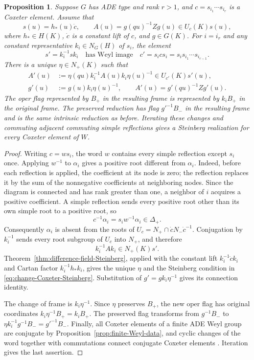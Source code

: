 \documentclass[11pt,leqno]{amsart}
\numberwithin{equation}{section}
\theoremstyle{plain}
\newtheorem{proposition}[theorem]{Proposition}
\theoremstyle{definition}
\theoremstyle{plain}
\theoremstyle{definition}
\theoremstyle{remark}
\begin{document}
\begin{proposition}\label{prop:change-Coxeter-oper-reduction}
Suppose $G$ has ADE type and rank $r>1$, and $c=s_{i_1}\cdots s_{i_r}$ is a Coxeter element. Assume that
\[
 s(u)=h_*(u)\dot c,\qquad
 A(u)=g(qu)^{-1}Zg(u)\in U_c(K)s(u),
\]
where $h_*\in H(K)$, $\dot c$ is a constant lift of $c$, and $g\in G(K)$. For $i=i_r$ and any constant representative $k_i\in N_G(H)$ of $s_i$, the element
\[
 s'=k_i^{-1}sk_i
 \quad\text{has Weyl image}\quad
 c'=s_i c s_i=s_i s_{i_1}\cdots s_{i_{r-1}}.
\]
There is a unique $\eta\in N_+(K)$ such that
\begin{equation}\label{eq:change-Coxeter-Steinberg}
 \begin{aligned}
 A'(u)&:=\eta(qu)k_i^{-1}A(u)k_i\eta(u)^{-1}
          \in U_{c'}(K)s'(u),\\
 g'(u)&:=g(u)k_i\eta(u)^{-1},\qquad
 A'(u)=g'(qu)^{-1}Zg'(u).
 \end{aligned}
\end{equation}
The oper flag represented by $B_+$ in the resulting frame is represented by $k_iB_+$ in the original frame. The preserved reduction has flag $g'^{-1}B_-$ in the resulting frame and is the same intrinsic reduction as before. Iterating these changes and commuting adjacent commuting simple reflections gives a Steinberg realization for every Coxeter element of $W$.
\end{proposition}
\begin{proof}
Writing $c=w s_i$, the word $w$ contains every simple reflection except $s_i$ once. Applying $w^{-1}$ to $\alpha_i$ gives a positive root different from $\alpha_i$. Indeed, before each reflection is applied, the coefficient at its node is zero; the reflection replaces it by the sum of the nonnegative coefficients at neighboring nodes. Since the diagram is connected and has rank greater than one, a neighbor of $i$ acquires a positive coefficient. A simple reflection sends every positive root other than its own simple root to a positive root, so
\[
 c^{-1}\alpha_i=s_iw^{-1}\alpha_i\in\Delta_+.
\]
Consequently $\alpha_i$ is absent from the roots of $U_c=N_+\cap\dot cN_-\dot c^{-1}$. Conjugation by $k_i^{-1}$ sends every root subgroup of $U_c$ into $N_+$, and therefore
\[
 k_i^{-1}Ak_i\in N_+(K)s'.
\]
Theorem~\ref{thm:difference-field-Steinberg}, applied with the constant lift $k_i^{-1}\dot c k_i$ and Cartan factor $k_i^{-1}h_*k_i$, gives the unique $\eta$ and the Steinberg condition in \eqref{eq:change-Coxeter-Steinberg}. Substitution of $g'=gk_i\eta^{-1}$ gives its connection identity.

The change of frame is $k_i\eta^{-1}$. Since $\eta$ preserves $B_+$, the new oper flag has original coordinates $k_i\eta^{-1}B_+=k_iB_+$. The preserved flag transforms from $g^{-1}B_-$ to $\eta k_i^{-1}g^{-1}B_-=g'^{-1}B_-$. Finally, all Coxeter elements of a finite ADE Weyl group are conjugate by Proposition~\ref{prop:finite-Weyl-data}, and cyclic changes of the word together with commutations connect conjugate Coxeter elements \cite{ErikssonEriksson2009}. Iteration gives the last assertion.
\end{proof}
\end{document}
